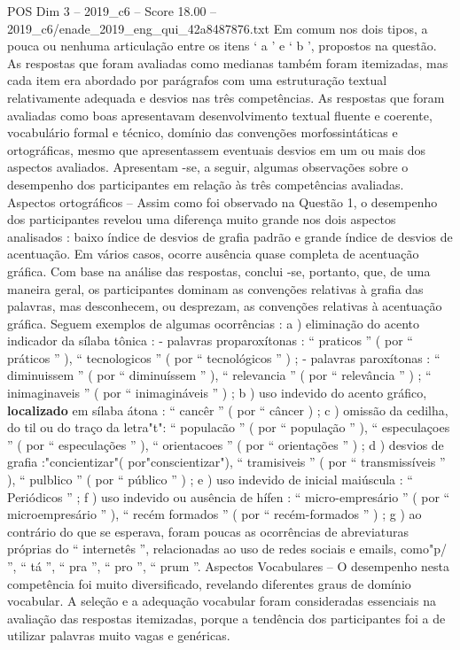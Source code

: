\begin{textsample}{POS Dim 3 – 2019\_c6 – Score 18.00 – 2019\_c6/enade\_2019\_eng\_qui\_42a8487876.txt}
Em comum nos dois tipos, a pouca ou nenhuma articulação entre os itens ‘ a ’ e ‘ b ’, propostos na questão.
As respostas que foram avaliadas como medianas também foram itemizadas, mas cada item era abordado por parágrafos com uma estruturação textual relativamente adequada e desvios nas três competências.
As respostas que foram avaliadas como boas apresentavam desenvolvimento textual fluente e coerente, vocabulário formal e técnico, domínio das convenções morfossintáticas e ortográficas, mesmo que apresentassem eventuais desvios em um ou mais dos aspectos avaliados.
Apresentam -se, a seguir, algumas observações sobre o desempenho dos participantes em relação às três competências avaliadas.
Aspectos ortográficos – Assim como foi observado na Questão 1, o desempenho dos participantes revelou uma diferença muito grande nos dois aspectos analisados : baixo índice de desvios de grafia padrão e grande índice de desvios de acentuação.
Em vários casos, ocorre ausência quase completa de acentuação gráfica.
Com base na análise das respostas, conclui -se, portanto, que, de uma maneira geral, os participantes dominam as convenções relativas à grafia das palavras, mas desconhecem, ou desprezam, as convenções relativas à acentuação gráfica.
Seguem exemplos de algumas ocorrências : a ) eliminação do acento indicador da sílaba tônica : - palavras proparoxítonas : “ praticos ” ( por “ práticos ” ), “ tecnologicos ” ( por “ tecnológicos ” ) ; - palavras paroxítonas : “ diminuissem ” ( por “ diminuíssem ” ), “ relevancia ” ( por “ relevância ” ) ; “ inimaginaveis ” ( por “ inimagináveis ” ) ; b ) uso indevido do acento gráfico, \textbf{localizado} em sílaba átona : “ cancêr ” ( por “ câncer ) ; c ) omissão da cedilha, do til ou do traço da letra"t": “ populacão ” ( por “ população ” ), “ especulaçoes ” ( por “ especulações ” ), “ orientacoes ” ( por “ orientações ” ) ; d ) desvios de grafia :"concientizar"( por"conscientizar"), “ tramisiveis ” ( por “ transmissíveis ” ), “ pulblico ” ( por “ público ” ) ; e ) uso indevido de inicial maiúscula : “ Periódicos ” ; f ) uso indevido ou ausência de hífen : “ micro-empresário ” ( por “ microempresário ” ), “ recém formados ” ( por “ recém-formados ” ) ; g ) ao contrário do que se esperava, foram poucas as ocorrências de abreviaturas próprias do “ internetês ”, relacionadas ao uso de redes sociais e emails, como"p/ ”, “ tá ”, “ pra ”, “ pro ”, “ prum ”.
Aspectos Vocabulares – O desempenho nesta competência foi muito diversificado, revelando diferentes graus de domínio vocabular.
A seleção e a adequação vocabular foram consideradas essenciais na avaliação das respostas itemizadas, porque a tendência dos participantes foi a de utilizar palavras muito vagas e genéricas.

\end{textsample}
